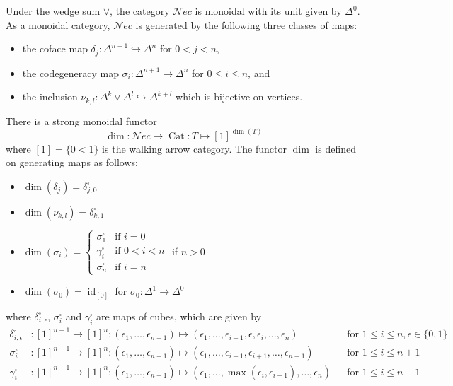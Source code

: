 \documentclass[12pt,a4paper,reqno]{amsart}
\DeclareMathOperator{\id}{id}
\DeclareMathOperator{\Cat}{Cat}
\newcommand{\nec}{\mathcal{N}ec} %
\theoremstyle{definition}
\theoremstyle{remark}
\begin{document}
Under the wedge sum $\vee$, the category $\nec$ is monoidal with its unit given by $\Delta^{0}$. As a monoidal category, $\nec$ is generated by the following three classes of maps:
\begin{itemize}
\item the coface map $\delta_{j}: \Delta^{n-1}\hookrightarrow \Delta^{n}$ for $0 < j < n$,
\item the codegeneracy map $\sigma_{i}: \Delta^{n+1}\to \Delta^{n}$ for $0\leq i\leq n$, and
\item the inclusion $\nu_{k,l}: \Delta^{k}\vee \Delta^{l}\hookrightarrow \Delta^{k+l}$ which is bijective on vertices.
\end{itemize}

There is a strong monoidal functor
\begin{equation}\label{diagram: dimension functor}
\dim: \nec\to \Cat: T\mapsto [1]^{\dim(T)}
\end{equation}
where $[1] = \{0 < 1\}$ is the walking arrow category. The functor $\dim$ is defined on generating maps as follows:
\begin{itemize}
\item $\dim(\delta_{j}) = \delta^{\square}_{j,0}$
\item $\dim(\nu_{k,l}) = \delta^{\square}_{k,1}$
\item $\dim(\sigma_{i}) =
\begin{cases}
\sigma^{\square}_{1} & \text{if }i = 0\\
\gamma^{\square}_{i} & \text{if }0 < i < n\\
\sigma^{\square}_{n} & \text{if }i = n
\end{cases}$
if $n > 0$
\item $\dim(\sigma_{0}) = \id_{[0]}$ for $\sigma_{0}: \Delta^{1}\to \Delta^{0}$
\end{itemize}
where $\delta^{\square}_{i,\epsilon}$, $\sigma^{\square}_{i}$ and $\gamma^{\square}_{i}$ are maps of cubes, which are given by
\begin{align*}
\delta^{\square}_{i,\epsilon}&: [1]^{n-1}\rightarrow [1]^{n}: (\epsilon_{1},\dots,\epsilon_{n-1})\mapsto (\epsilon_{1},\dots,\epsilon_{i-1},\epsilon,\epsilon_{i},\dots,\epsilon_{n}) &&\text{for }1\leq i\leq n, \epsilon\in \{0,1\}\\
\sigma^{\square}_{i}&: [1]^{n+1}\rightarrow [1]^{n}: (\epsilon_{1},\dots,\epsilon_{n+1})\mapsto (\epsilon_{1},\dots,\epsilon_{i-1},\epsilon_{i+1},\dots,\epsilon_{n+1}) &&\text{for }1\leq i\leq n+1\\
\gamma^{\square}_{i}&: [1]^{n+1}\rightarrow [1]^{n}: (\epsilon_{1},\dots,\epsilon_{n+1})\mapsto (\epsilon_{1},\dots,\max(\epsilon_{i},\epsilon_{i+1}),\dots,\epsilon_{n}) &&\text{for }1\leq i\leq n-1
\end{align*}
\end{document}
